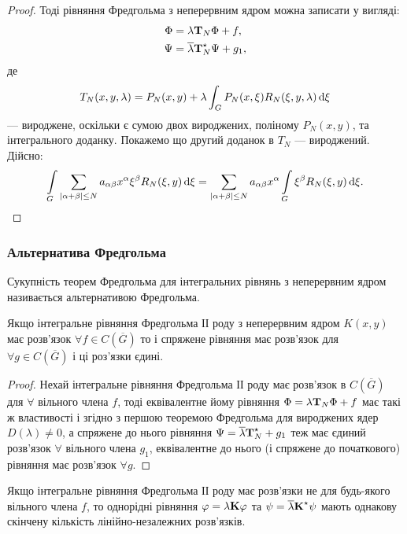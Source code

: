 \begin{proof}
	Тоді рівняння Фредгольма з неперервним ядром можна записати у вигляді:
	\begin{align}
		\Phi &= \lambda \bf{T}_N \Phi + f, \\
		\Psi &= \overline \lambda \bf{T}_N^\star \Psi + g_1,
	\end{align}
	де 
	\begin{equation}
		T_N(x, y, \lambda) = P_N(x, y) + \lambda \int_G P_N(x, \xi) R_N(\xi, y, \lambda) \diff \xi
	\end{equation}
	--- вироджене, оскільки є сумою двох вироджених, поліному $P_N(x, y)$, та інтегрального доданку. Покажемо що другий доданок в $T_N$ --- вироджений. Дійсно:
	\begin{equation}
		\Int_G \Sum_{|\alpha + \beta| \le N} a_{\alpha \beta} x^\alpha \xi^\beta R_N(\xi, y) \diff \xi = \Sum_{|\alpha + \beta| \le N} a_{\alpha \beta} x^\alpha \Int_G \xi^\beta R_N(\xi, y) \diff \xi.
	\end{equation}
\end{proof}

\subsubsection{Альтернатива Фредгольма}

Сукупність теорем Фредгольма для інтегральних рівнянь з неперервним ядром називається альтернативою Фредгольма.

\begin{theorem}
	Якщо інтегральне рівняння Фредгольма ІІ роду з неперервним ядром $K(x, y)$ має розв'язок $\forall f \in C\left(\overline G\right)$ то і спряжене рівняння має розв'язок для $\forall g \in C(\overline G)$ і ці роз'язки єдині.
\end{theorem}

\begin{proof}
	Нехай інтегральне рівняння Фредгольма ІІ роду має розв'язок в $C\left(\overline G\right)$ для $\forall$ вільного члена $f$, тоді еквівалентне йому рівняння $\Phi = \lambda \bf{T}_N \Phi + f$ має такі ж властивості і згідно з першою теоремою Фредгольма для вироджених ядер $D(\lambda) \ne 0$, а спряжене до нього рівняння $\Psi = \overline \lambda \bf{T}_N^\star  + g_1$ теж має єдиний розв'язок $\forall$ вільного члена $g_1$, еквівалентне до нього (і спряжене до початкового) рівняння має розв'язок $\forall g$.
\end{proof}

\begin{theorem}
	Якщо інтегральне рівняння Фредгольма ІІ роду має розв'язки не для будь-якого вільного члена $f$, то однорідні рівняння $\phi = \lambda \bf{K} \phi$ та $\psi = \overline \lambda \bf{K}^\star \psi$ мають однакову скінчену кількість лінійно-незалежних розв'язків.
\end{theorem}

